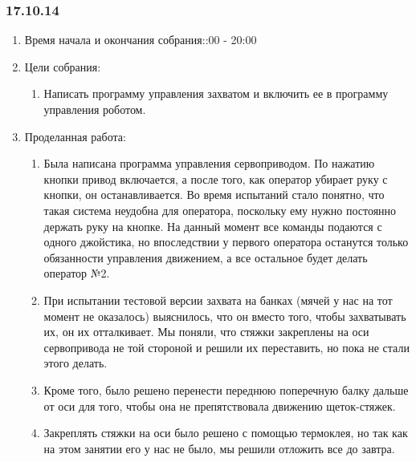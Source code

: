 
\subsubsection{17.10.14}

\begin{enumerate}
	\item Время начала и окончания собрания::00 - 20:00
	\item Цели собрания:\newline
	\begin{enumerate}
	  \item Написать программу управления захватом и включить ее в программу управления роботом.\newline
	  
    \end{enumerate}
    
	\item Проделанная работа:\newline
	\begin{enumerate}
	  \item Была написана программа управления сервоприводом. По нажатию кнопки привод включается, а после того, как оператор убирает руку с кнопки, он останавливается. Во время испытаний стало понятно, что такая система неудобна для оператора, поскольку ему нужно постоянно держать руку на кнопке. На данный момент все команды подаются с одного джойстика, но впоследствии у первого оператора останутся только обязанности управления движением, а все остальное будет делать оператор №2.\newline
      
      \item При испытании тестовой версии захвата на банках (мячей у нас на тот момент не оказалось) выяснилось, что он вместо того, чтобы захватывать их, он их отталкивает. Мы поняли, что стяжки закреплены на оси сервопривода не той стороной и решили их переставить, но пока не стали этого делать.\newline
      
      \item Кроме того, было решено перенести переднюю поперечную балку дальше от оси для того, чтобы она не препятствовала движению щеток-стяжек.\newline
      
      \item Закреплять стяжки на оси было решено с помощью термоклея, но так как на этом занятии его у нас не было, мы решили отложить все до завтра.\newline
      

\end{enumerate}
\end{enumerate}
